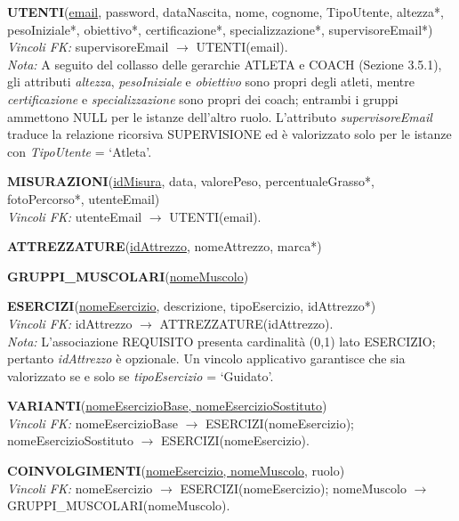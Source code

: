 \documentclass[12pt]{report}
\begin{document}
\vspace{0.5cm}

\noindent
\textbf{UTENTI}(\underline{email}, password, dataNascita, nome, cognome,
TipoUtente, altezza*, pesoIniziale*, obiettivo*, certificazione*,
specializzazione*, supervisoreEmail*) \\
\textit{Vincoli FK:} supervisoreEmail $\rightarrow$ UTENTI(email). \\
\textit{Nota:} A seguito del collasso delle gerarchie ATLETA e COACH
(Sezione 3.5.1), gli attributi \textit{altezza}, \textit{pesoIniziale}
e \textit{obiettivo} sono propri degli atleti, mentre
\textit{certificazione} e \textit{specializzazione} sono propri dei
coach; entrambi i gruppi ammettono NULL per le istanze dell'altro ruolo.
L'attributo \textit{supervisoreEmail} traduce la relazione ricorsiva
SUPERVISIONE ed è valorizzato solo per le istanze con
\textit{TipoUtente} = `Atleta'.

\vspace{0.3cm}
\noindent
\textbf{MISURAZIONI}(\underline{idMisura}, data, valorePeso,
percentualeGrasso*, fotoPercorso*, utenteEmail) \\
\textit{Vincoli FK:} utenteEmail $\rightarrow$ UTENTI(email).

\vspace{0.3cm}
\noindent
\textbf{ATTREZZATURE}(\underline{idAttrezzo}, nomeAttrezzo, marca*)

\vspace{0.3cm}
\noindent
\textbf{GRUPPI\_MUSCOLARI}(\underline{nomeMuscolo})

\vspace{0.3cm}
\noindent
\textbf{ESERCIZI}(\underline{nomeEsercizio}, descrizione, tipoEsercizio,
idAttrezzo*) \\
\textit{Vincoli FK:} idAttrezzo $\rightarrow$ ATTREZZATURE(idAttrezzo). \\
\textit{Nota:} L'associazione REQUISITO presenta cardinalità (0,1) lato
ESERCIZIO; pertanto \textit{idAttrezzo} è opzionale. Un vincolo
applicativo garantisce che sia valorizzato se e solo se
\textit{tipoEsercizio} = `Guidato'.

\vspace{0.3cm}
\noindent
\textbf{VARIANTI}(\underline{nomeEsercizioBase, nomeEsercizioSostituto}) \\
\textit{Vincoli FK:} nomeEsercizioBase $\rightarrow$ ESERCIZI(nomeEsercizio);
nomeEsercizioSostituto $\rightarrow$ ESERCIZI(nomeEsercizio).

\vspace{0.3cm}
\noindent
\textbf{COINVOLGIMENTI}(\underline{nomeEsercizio, nomeMuscolo}, ruolo) \\
\textit{Vincoli FK:} nomeEsercizio $\rightarrow$ ESERCIZI(nomeEsercizio);
nomeMuscolo $\rightarrow$ GRUPPI\_MUSCOLARI(nomeMuscolo).
\end{document}
